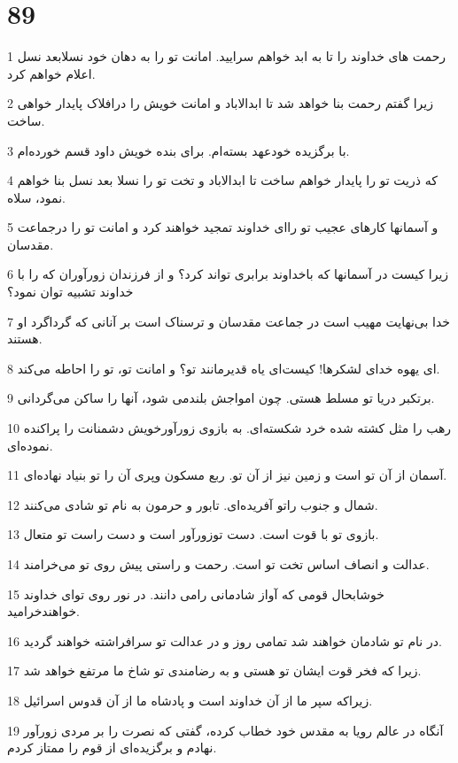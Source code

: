 \chapter{89}

\par 1 رحمت های خداوند را تا به ابد خواهم سرایید. امانت تو را به دهان خود نسلابعد نسل اعلام خواهم کرد.
\par 2 زیرا گفتم رحمت بنا خواهد شد تا ابدالاباد و امانت خویش را درافلاک پایدار خواهی ساخت.
\par 3 با برگزیده خودعهد بسته‌ام. برای بنده خویش داود قسم خورده‌ام.
\par 4 که ذریت تو را پایدار خواهم ساخت تا ابدالاباد و تخت تو را نسلا بعد نسل بنا خواهم نمود، سلاه.
\par 5 و آسمانها کارهای عجیب تو را‌ای خداوند تمجید خواهند کرد و امانت تو را درجماعت مقدسان.
\par 6 زیرا کیست در آسمانها که باخداوند برابری تواند کرد؟ و از فرزندان زورآوران که را با خداوند تشبیه توان نمود؟
\par 7 خدا بی‌نهایت مهیب است در جماعت مقدسان و ترسناک است بر آنانی که گرداگرد او هستند.
\par 8 ‌ای یهوه خدای لشکرها! کیست‌ای یاه قدیرمانند تو؟ و امانت تو، تو را احاطه می‌کند.
\par 9 برتکبر دریا تو مسلط هستی. چون امواجش بلندمی شود، آنها را ساکن می‌گردانی.
\par 10 رهب را مثل کشته شده خرد شکسته‌ای. به بازوی زورآورخویش دشمنانت را پراکنده نموده‌ای.
\par 11 آسمان از آن تو است و زمین نیز از آن تو. ربع مسکون وپری آن را تو بنیاد نهاده‌ای.
\par 12 شمال و جنوب راتو آفریده‌ای. تابور و حرمون به نام تو شادی می‌کنند.
\par 13 بازوی تو با قوت است. دست توزورآور است و دست راست تو متعال.
\par 14 عدالت و انصاف اساس تخت تو است. رحمت و راستی پیش روی تو می‌خرامند.
\par 15 خوشابحال قومی که آواز شادمانی رامی دانند. در نور روی تو‌ای خداوند خواهندخرامید.
\par 16 در نام تو شادمان خواهند شد تمامی روز و در عدالت تو سرافراشته خواهند گردید.
\par 17 زیرا که فخر قوت ایشان تو هستی و به رضامندی تو شاخ ما مرتفع خواهد شد.
\par 18 زیراکه سپر ما از آن خداوند است و پادشاه ما از آن قدوس اسرائیل.
\par 19 آنگاه در عالم رویا به مقدس خود خطاب کرده، گفتی که نصرت را بر مردی زورآور نهادم و برگزیده‌ای از قوم را ممتاز کردم.
